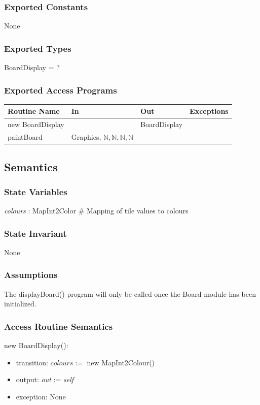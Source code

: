 \documentclass{article}
\begin{document}
		\subsubsection*{Exported Constants}
			None

		\subsubsection*{Exported Types}
			BoardDisplay = ?

		\subsubsection*{Exported Access Programs}
			\begin{tabular}{|l|l|l|p{5cm}|}
				\hline
				\textbf{Routine Name} & \textbf{In} & \textbf{Out} & \textbf{Exceptions} \\
				\hline
				new BoardDisplay & & BoardDisplay & \\
				\hline
				paintBoard & Graphics, $\mathbb{N},\mathbb{N},\mathbb{N},\mathbb{N}$ & & \\
				\hline
			\end{tabular}

	\subsection*{Semantics}

		\subsubsection*{State Variables}
			\textit{colours} : MapInt2Color \# Mapping of tile values to colours

		\subsubsection*{State Invariant}
			None

		\subsubsection*{Assumptions}
			The displayBoard() program will only be called once the Board module has been initialized.

		\subsubsection*{Access Routine Semantics}
			\noindent new BoardDisplay():
			\begin{itemize}
				\item transition: $colours := $ new MapInt2Colour()
				\item output: \textit{out} := \textit{self}
				\item exception: None
			\end{itemize}
\end{document}
